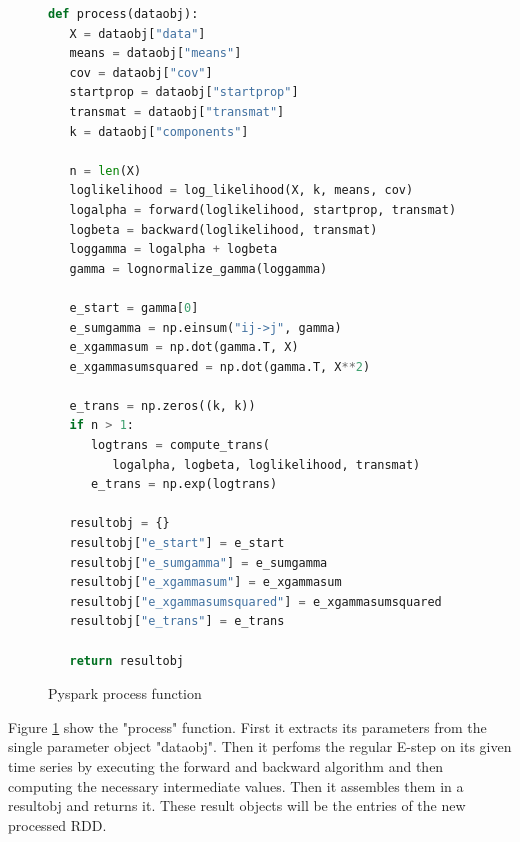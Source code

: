 \begin{figure}
\begin{singlespace}
\begin{lstlisting}[language=Python]
def process(dataobj):
   X = dataobj["data"]
   means = dataobj["means"]
   cov = dataobj["cov"]
   startprop = dataobj["startprop"]
   transmat = dataobj["transmat"]
   k = dataobj["components"]

   n = len(X)
   loglikelihood = log_likelihood(X, k, means, cov)
   logalpha = forward(loglikelihood, startprop, transmat)
   logbeta = backward(loglikelihood, transmat)
   loggamma = logalpha + logbeta
   gamma = lognormalize_gamma(loggamma)

   e_start = gamma[0]
   e_sumgamma = np.einsum("ij->j", gamma)
   e_xgammasum = np.dot(gamma.T, X)
   e_xgammasumsquared = np.dot(gamma.T, X**2)

   e_trans = np.zeros((k, k))
   if n > 1:
      logtrans = compute_trans(
         logalpha, logbeta, loglikelihood, transmat)
      e_trans = np.exp(logtrans)

   resultobj = {}
   resultobj["e_start"] = e_start
   resultobj["e_sumgamma"] = e_sumgamma
   resultobj["e_xgammasum"] = e_xgammasum
   resultobj["e_xgammasumsquared"] = e_xgammasumsquared
   resultobj["e_trans"] = e_trans

   return resultobj
\end{lstlisting}
\end{singlespace}
\caption{Pyspark process function}    
\label{fig:pyspark-process-listing}
\end{figure}

Figure \ref{fig:pyspark-process-listing} show the "process" function. First it extracts its parameters from the single parameter object "dataobj". Then it perfoms the regular E-step on its given time series by executing the forward and backward algorithm and then computing the necessary intermediate values. Then it assembles them in a resultobj and returns it. These result objects will be the entries of the new processed RDD.